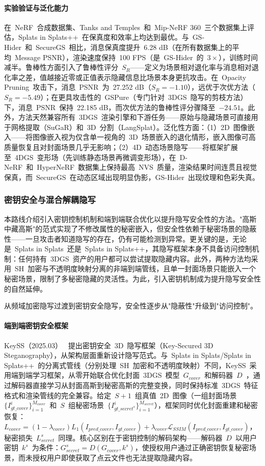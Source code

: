 \paragraph{实验验证与泛化能力}在~NeRF~合成数据集、Tanks and Temples~和~Mip-NeRF 360~三个数据集上评估，Splats in Splats++~在保真度和效率上均达到最优。与~GS-Hider~和~SecureGS~相比，消息保真度提升~6.28 dB（在所有数据集上的平均~Message PSNR），渲染速度保持~100 FPS（是~GS-Hider~的~$3\times$），训练时间减半。鲁棒性方面引入了鲁棒性评分~$S_R$——定义为场景相对退化率与消息相对退化率之差，值越接近零或正值表示隐藏信息比场景本身更抗攻击。在~Opacity Pruning~攻击下，消息~PSNR~为~27.252 dB（$S_R = -1.10$），远优于次优方法（$S_R = -5.49$）；在更具攻击性的~GSPure（专门针对~3DGS~隐写的剪枝方法）下，消息~PSNR~保持~22.185 dB，而次优方法的鲁棒性评分骤降至~$-24.51$。此外，方法天然兼容所有~3DGS~渲染引擎和下游任务——原始与隐藏场景可直接用于网格提取（SuGaR）和~3D~分割（LangSplat）。泛化性方面：（1）2D~图像嵌入——将图像嵌入视为仅含单一视角的~3D~场景嵌入的退化情形，嵌入图像可高质量恢复且对封面场景几乎无影响；（2）4D~动态场景隐写——将框架扩展至~4DGS~变形场（先训练静态场景再微调变形场），在~D-NeRF~和~HyperNeRF~数据集上保持最高~NVS~质量，渲染结果时间连贯且视觉保真，而~SecureGS~在动态区域出现明显伪影，GS-Hider~出现纹理和色彩失真。

\subsubsection{密钥安全与混合解耦隐写}

本路线介绍引入密钥控制机制和端到端联合优化以提升隐写安全性的方法。"高斯中藏高斯"的范式实现了不修改属性的秘密嵌入，但安全性依赖于秘密场景的隐蔽性——一旦攻击者知道隐写的存在，仍有可能检测到异常。更关键的是，无论是~Splats in Splats~还是~Splats in Splats++，其隐写框架本身不具备访问控制机制：任何持有~3DGS~资产的用户都可以尝试提取隐藏内容。此外，两种方法均采用~SH~加密与不透明度映射分离的非端到端管线，且单一封面场景只能嵌入一个秘密场景，限制了多秘密隐藏的灵活性。为此，引入密钥机制成为提升隐写安全性的自然延伸。

从频域加密隐写过渡到密钥安全隐写，安全性逐步从"隐蔽性"升级到"访问控制"。

\paragraph{端到端密钥安全框架}KeySS（2025.03）~\cite{2503_07191} 提出密钥安全~3D~隐写框架（Key-Secured 3D Steganography），从架构层面重新设计隐写范式。与~Splats in Splats/Splats in Splats++~的分离式管线（分别处理~SH~加密和不透明度映射）不同，KeySS~采用端到端学习框架，从零开始联合优化封面~3DGS~模型~$G_{cover}$~和解码器~$D$~，通过解码器直接学习从封面高斯到秘密高斯的完整变换，同时保持标准~3DGS~特征格式和渲染管线的完全兼容。给定~$S+1$~组真值~2D~图像（一组封面场景~$\{I_{gt\_cover}^i\}_{i=1}^{M_{cover}}$~和~$S$~组秘密场景~$\{I_{gt\_secret^{s}}^i\}_{i=1}^{M_{secret}}$），框架同时优化封面重建和秘密恢复：$L_{cover} = (1-\lambda_{cover})L_1(I_{pred\_cover}, I_{gt\_cover}) + \lambda_{cover}\mathcal{L}_{SSIM}(I_{pred\_cover}, I_{gt\_cover})$，秘密损失~$L_{secret}^s$~同理。核心区别在于密钥控制的解码架构——解码器~$D$~以用户密钥~$k^s$~为条件：$G_{secret}^s = D(G_{cover}, k^s)$，使授权用户通过正确密钥恢复秘密场景，而未授权用户即使获取了点云文件也无法提取隐藏内容。

